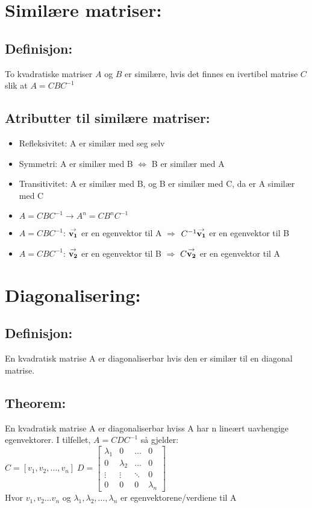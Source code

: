 \documentclass[12pt,a4paper,twocolumn,twoside]{article}
\def\vector#1{\bold{\stackrel{\rightarrow}{#1}}}
\begin{document}
\section*{Similære matriser:}
\subsection*{Definisjon:}
To kvadratiske matriser $A$ og $B$ er similære, hvis det finnes en ivertibel matrise $C$ slik at $A=CBC^{-1}$
\subsection*{Atributter til similære matriser:}
\begin{itemize}[topsep=0pt,itemsep=0pt, partopsep=0pt]
    \item Refleksivitet: A er similær med seg selv
    \item Symmetri: A er similær med B $\Leftrightarrow$ B er similær med A
    \item Transitivitet: A er similær med B, og B er similær med C, da er A similær med C
    \item $A=CBC^{-1}\rightarrow A^n=CB^nC^{-1}$
    \item $A=CBC^{-1}$: $\vector{v_1}$ er en egenvektor til A $\Rightarrow$ $C^{-1}\vector{v_1}$ er en egenvektor til B
    \item $A=CBC^{-1}$: $\vector{v_2}$ er en egenvektor til B $\Rightarrow$ $C\vector{v_2}$ er en egenvektor til A
\end{itemize}

\section*{Diagonalisering:}
\subsection*{Definisjon:}
En kvadratisk matrise A er diagonaliserbar hvis den er similær til en diagonal matrise.
\subsection*{Theorem:}
En kvadratisk matrise A er diagonaliserbar hviss A har n lineært uavhengige egenvektorer.
I tilfellet, $A=CDC^{-1}$ så gjelder:\\
$C=[v_1,v_2,\dots,v_n] \; D=\begin{bmatrix}
    \lambda_1 & 0 & \dots & 0\\
    0 & \lambda_2 & \dots & 0\\
    \vdots & \vdots & \ddots & 0\\
    0 & 0 & 0 & \lambda_n
\end{bmatrix}$\\
Hvor $v_1,v_2\dots v_n$ og $\lambda_1,\lambda_2, \dots,\lambda_n$ er egenvektorene/verdiene til A
\end{document}
